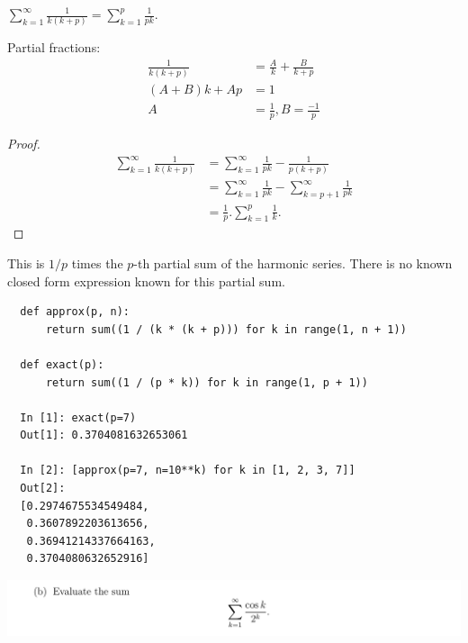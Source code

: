 \documentclass[12pt]{article}
\begin{document}
\begin{claim*}
  $\sum_{k=1}^\infty \frac{1}{k(k+p)} = \sum_{k=1}^p\frac{1}{pk}$.
\end{claim*}

\begin{mdframed}
  Partial fractions:
\begin{align*}
  \frac{1}{k(k+p)} &= \frac{A}{k} + \frac{B}{k + p}\\
  (A + B)k + Ap &= 1\\
  A &= \frac{1}{p}, B = \frac{-1}{p}
\end{align*}
\end{mdframed}

\begin{proof}
  \begin{align*}
    \sum_{k=1}^\infty \frac{1}{k(k+p)} &= \sum_{k=1}^\infty \frac{1}{pk} - \frac{1}{p(k + p)}\\
                                       &= \sum_{k=1}^\infty \frac{1}{pk} - \sum_{k=p+1}^\infty  \frac{1}{pk}\\
                                       &= \frac{1}{p}.\sum_{k=1}^p\frac{1}{k}.
  \end{align*}
\end{proof}
\begin{remark*}
  This is $1/p$ times the $p$-th partial sum of the harmonic series. There is no known closed form
  expression known for this partial sum.
\end{remark*}


\begin{verbatim}
  def approx(p, n):
      return sum((1 / (k * (k + p))) for k in range(1, n + 1))

  def exact(p):
      return sum((1 / (p * k)) for k in range(1, p + 1))

  In [1]: exact(p=7)
  Out[1]: 0.3704081632653061

  In [2]: [approx(p=7, n=10**k) for k in [1, 2, 3, 7]]
  Out[2]:
  [0.2974675534549484,
   0.3607892203613656,
   0.36941214337664163,
   0.3704080632652916]
\end{verbatim}

\begin{mdframed}
\includegraphics[width=400pt]{img/analysis--oxford-M2-I-5-2-b.png}
\end{mdframed}
\end{document}

